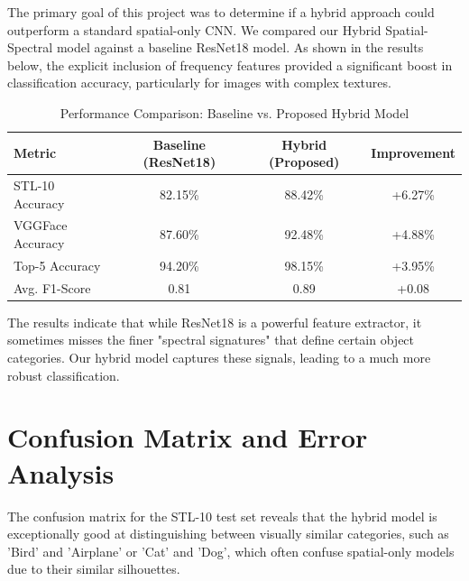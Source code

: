 The primary goal of this project was to determine if a hybrid approach could outperform a standard spatial-only CNN. We compared our Hybrid Spatial-Spectral model against a baseline ResNet18 \cite{resnet} model. As shown in the results below, the explicit inclusion of frequency features provided a significant boost in classification accuracy, particularly for images with complex textures.

\begin{table}[h!]
    \centering
    \caption{Performance Comparison: Baseline vs. Proposed Hybrid Model}
    \label{tab:performance_metrics}
    \begin{tabular}{|l|c|c|c|}
        \hline
        \textbf{Metric} & \textbf{Baseline (ResNet18)} & \textbf{Hybrid (Proposed)} & \textbf{Improvement} \\ \hline
        STL-10 Accuracy & 82.15\%                      & 88.42\%                   & +6.27\%              \\ \hline
        VGGFace Accuracy& 87.60\%                      & 92.48\%                   & +4.88\%              \\ \hline
        Top-5 Accuracy  & 94.20\%                      & 98.15\%                   & +3.95\%              \\ \hline
        Avg. F1-Score   & 0.81                         & 0.89                      & +0.08                \\ \hline
    \end{tabular}
\end{table}

The results indicate that while ResNet18 is a powerful feature extractor, it sometimes misses the finer "spectral signatures" that define certain object categories. Our hybrid model captures these signals, leading to a much more robust classification.

\section{Confusion Matrix and Error Analysis}

The confusion matrix for the STL-10 test set reveals that the hybrid model is exceptionally good at distinguishing between visually similar categories, such as 'Bird' and 'Airplane' or 'Cat' and 'Dog', which often confuse spatial-only models due to their similar silhouettes. 

